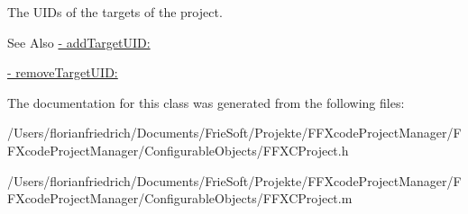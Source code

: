 The U\-I\-Ds of the targets of the project. \begin{DoxySeeAlso}{See Also}
\hyperlink{interface_f_f_x_c_project_af44108d30989f792d0d78d6817e60d32}{-\/ add\-Target\-U\-I\-D\-:} 

\hyperlink{interface_f_f_x_c_project_a6d0df7145384379ba54bb94b4cb11758}{-\/ remove\-Target\-U\-I\-D\-:} 
\end{DoxySeeAlso}


The documentation for this class was generated from the following files\-:\begin{DoxyCompactItemize}
\item 
/\-Users/florianfriedrich/\-Documents/\-Frie\-Soft/\-Projekte/\-F\-F\-Xcode\-Project\-Manager/\-F\-F\-Xcode\-Project\-Manager/\-Configurable\-Objects/F\-F\-X\-C\-Project.\-h\item 
/\-Users/florianfriedrich/\-Documents/\-Frie\-Soft/\-Projekte/\-F\-F\-Xcode\-Project\-Manager/\-F\-F\-Xcode\-Project\-Manager/\-Configurable\-Objects/F\-F\-X\-C\-Project.\-m\end{DoxyCompactItemize}
